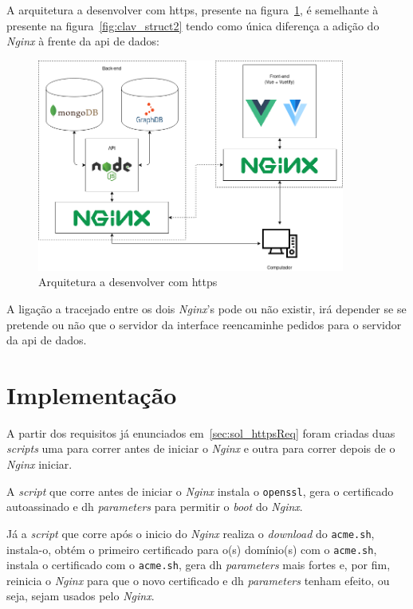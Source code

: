 A arquitetura a desenvolver com \acrshort{https}, presente na figura~\ref{fig:apiHttpsArch}, é semelhante à presente na figura~\ref{fig:clav_struct2} tendo como única diferença a adição do \textit{Nginx} à frente da \acrshort{api} de dados:
\begin{figure}[H]
    \centering
    \includegraphics[width=0.9\textwidth]{img/apiHttpsArch.png}
    \caption{Arquitetura a desenvolver com \acrshort{https}\label{fig:apiHttpsArch}}
\end{figure}

A ligação a tracejado entre os dois \textit{Nginx}'s pode ou não existir, irá depender se se pretende ou não que 
o servidor da interface reencaminhe pedidos para o servidor da \acrshort{api} de dados.

\section{Implementação}

A partir dos requisitos já enunciados em~\ref{sec:sol_httpsReq} foram criadas duas \textit{scripts} uma para correr antes de iniciar o \textit{Nginx} e outra para correr depois de o \textit{Nginx} iniciar.

A \textit{script} que corre antes de iniciar o \textit{Nginx} instala o \texttt{openssl}, gera o certificado autoassinado e \acrshort{dh} \textit{parameters} para permitir o \textit{boot} do \textit{Nginx}.

Já a \textit{script} que corre após o inicio do \textit{Nginx} realiza o \textit{download} do \texttt{acme.sh}, instala-o, obtém o primeiro certificado para o(s) domínio(s) com o \texttt{acme.sh}, instala o certificado com o \texttt{acme.sh}, gera \acrshort{dh} \textit{parameters} mais fortes e, por fim, reinicia o \textit{Nginx} para que o novo certificado e \acrshort{dh} \textit{parameters} tenham efeito, ou seja, sejam usados pelo \textit{Nginx}.

